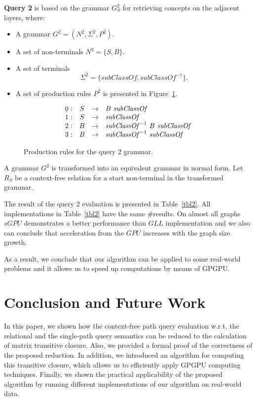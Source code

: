 \documentclass[runningheads,a4paper]{llncs}
\begin{document}
\textbf{Query 2} is based on the grammar $G^2_S$ for retrieving concepts on the adjacent layers, where:
\begin{itemize}
	\item A grammar $G^2 = (N^2, \Sigma^2, P^2)$.
	\item A set of non-terminals $N^2 = \{S, B\}$.
	\item A set of terminals $$\Sigma^2 = \{subClassOf, subClassOf^{-1}\}.$$
	\item A set of production rules $P^2$ is presented in Figure~\ref{ProductionRulesQuery2}.
\end{itemize}

\begin{figure}[h]
	\[
	\begin{array}{rccl}
	0: & S & \rightarrow & B \ \text{\textit{subClassOf}} \\ 
	1: & S & \rightarrow & \text{\textit{subClassOf}} \\ 
	2: & B & \rightarrow & \text{\textit{subClassOf}}^{-1} \ B \ \text{\textit{subClassOf}} \\ 
	3: & B & \rightarrow & \text{\textit{subClassOf}}^{-1} \ \text{\textit{subClassOf}} \\ 
	\end{array}
	\]
	\caption{Production rules for the query 2 grammar.}
	\label{ProductionRulesQuery2}
\end{figure}

A grammar $G^2$ is transformed into an equivalent grammar in normal form. Let $R_S$ be a context-free relation for a start non-terminal in the transformed grammar.

The result of the query 2 evaluation is presented in Table~\ref{tbl2}. All implementations in Table~\ref{tbl2} have the same \#results. On almost all graphs $sGPU$ demonstrates a better performance than $GLL$ implementation and we also can conclude that acceleration from the $GPU$ increases with the graph size growth.

As a result, we conclude that our algorithm can be applied to some real-world problems and it allows us to speed up computations by means of GPGPU.


\section{Conclusion and Future Work}%
In this paper, we shown how the context-free path query evaluation w.r.t. the relational and the single-path query semantics can be reduced to the calculation of matrix transitive closure. Also, we provided a formal proof of the correctness of the proposed reduction. In addition, we introduced an algorithm for computing this transitive closure, which allows us to efficiently apply GPGPU computing techniques. Finally, we shown the practical applicability of the proposed algorithm by running different implementations of our algorithm on real-world data.
\end{document}

